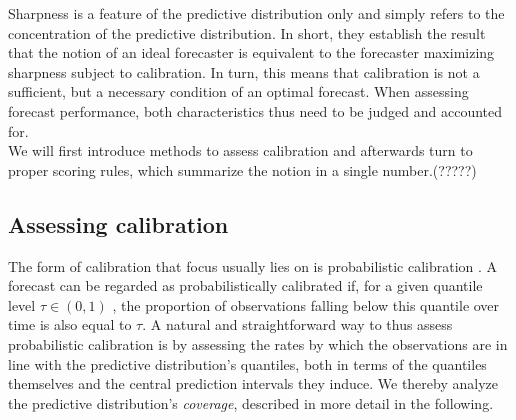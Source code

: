 Sharpness is a feature of the predictive distribution only and simply refers to the concentration of the predictive distribution. In short, they establish the result that the notion of an ideal forecaster is equivalent to the forecaster maximizing sharpness subject to calibration. In turn, this means that calibration is not a sufficient, but a necessary condition of an optimal forecast. When assessing forecast performance, both characteristics thus need to be judged and accounted for.\\
We will first introduce methods to assess calibration and afterwards turn to proper scoring rules, which summarize the notion in a single number.(?????)
\subsection{Assessing calibration}
The form of calibration that focus usually lies on is probabilistic calibration \citep{bosse_evaluating_2022}. A forecast can be regarded as probabilistically calibrated if, for a given quantile level $\tau \in (0,1)$ , the proportion of observations falling below this quantile over time is also equal to $\tau$. A natural and straightforward way to thus assess probabilistic calibration is by assessing the rates by which the observations are in line with the predictive distribution's quantiles, both in terms of the quantiles themselves and the central prediction intervals they induce. We thereby analyze the predictive distribution's \textit{coverage}, described in more detail in the following.
